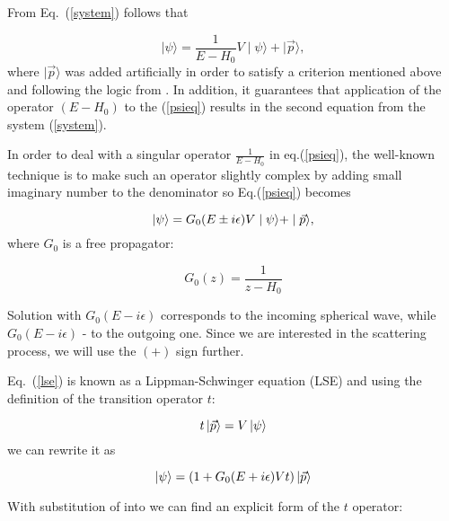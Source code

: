     From Eq.~(\ref{system}) follows that

    \begin{equation}
        \mid \psi \rangle = \frac{1}{E - H_0}V \mid \psi \rangle +  \mid \vec{p} \rangle,
        \label{psieq}
    \end{equation}
    where $\mid \vec{p} \rangle$ was added artificially in order to satisfy a criterion mentioned above 
    and following the logic from \cite{Sakurai}. In addition, it guarantees that
     application of the operator $(E -H_0)$ to the 
    (\ref{psieq}) results in the second equation from the system (\ref{system}).

    In order to deal with a singular operator $\frac{1}{E - H_0}$ in eq.(\ref{psieq}), the well-known
    technique is to make such an operator slightly complex by adding small imaginary number to the denominator
    so Eq.(\ref{psieq}) becomes

    \begin{equation}
        \ket{\psi} = G_0(E \pm i\epsilon)V \mid \psi \rangle +  \mid \vec{p} \rangle,
        \label{lse}
    \end{equation}
    where $G_0$ is a free propagator:

    \begin{equation}
        G_0(z) = \frac{1}{z - H_0}
        \label{g0}
    \end{equation}

    Solution with $G_0(E - i\epsilon)$ corresponds to the incoming spherical wave,
    while $G_0(E - i\epsilon)$ - to the outgoing one. Since we are interested in the scattering
    process, we will use the $(+)$ sign further.
    
    Eq.~(\ref{lse}) is known as a Lippman-Schwinger equation (LSE) and using
    the definition of the transition operator $t$:

    \begin{equation}
        t \ket{\vec{p}} = V \ket{\psi}
        \label{t-op}
    \end{equation}
    we can rewrite it as 

    \begin{equation}
        \ket{\psi} = (1 + G_0(E + i\epsilon)V t)  \ket {\vec{p}}
        \label{psi_toper}
    \end{equation}

    With substitution of  into  we can find
    an explicit form of the $t$ operator:

